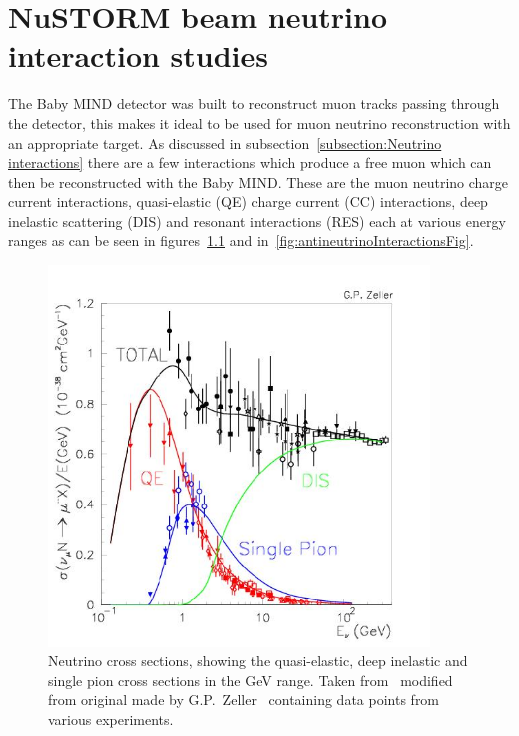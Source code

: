 \chapter{NuSTORM beam neutrino interaction studies}
\label{c:neutrinoNuSTORM}

The Baby MIND detector was built to reconstruct muon tracks passing through the detector, this makes it ideal to be used for muon neutrino reconstruction with an appropriate target. As discussed in subsection~\ref{subsection:Neutrino interactions} there are a few interactions which produce a free muon which can then be reconstructed with the Baby MIND. These are the muon neutrino charge current interactions, quasi-elastic (QE) charge current (CC) interactions, deep inelastic scattering (DIS) and resonant interactions (RES) each at various energy ranges as can be seen in figures~\ref{fig:neutrinoInteractionsFig} and in~\ref{fig:antineutrinoInteractionsFig}.

\begin{figure}[h!]
\centering
\includegraphics[width=0.9\textwidth]{figures/figs_zeller-total-numode.png}
\caption{Neutrino cross sections, showing the quasi-elastic, deep inelastic and single pion cross sections in the GeV range. Taken from~\cite{82McFarland} modified from original made by G.P.~Zeller~\cite{106Zeller} containing data points from various experiments.}
\label{fig:neutrinoInteractionsFig}
\end{figure}

